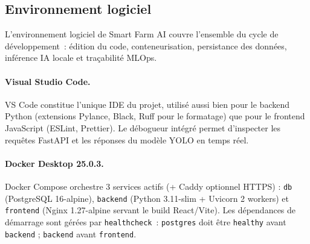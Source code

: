 \subsection{Environnement logiciel}

L'environnement logiciel de Smart Farm AI couvre l'ensemble du cycle de
développement~: édition du code, conteneurisation, persistance des données,
inférence IA locale et traçabilité MLOps.

\paragraph{Visual Studio Code.}
VS Code constitue l'unique IDE du projet, utilisé aussi bien pour le backend
Python (extensions Pylance, Black, Ruff pour le formatage) que pour le
frontend JavaScript (ESLint, Prettier). Le débogueur intégré permet
d'inspecter les requêtes FastAPI et les réponses du modèle YOLO en temps réel.

\paragraph{Docker Desktop 25.0.3.}
Docker Compose orchestre 3 services actifs (+ Caddy optionnel HTTPS) :
\texttt{db} (PostgreSQL 16-alpine), \texttt{backend} (Python 3.11-slim + Uvicorn
2 workers) et \texttt{frontend} (Nginx 1.27-alpine servant le build React/Vite).
Les dépendances de démarrage sont gérées par \texttt{healthcheck}~:
\texttt{postgres} doit être \texttt{healthy} avant \texttt{backend} ;
\texttt{backend} avant \texttt{frontend}.

